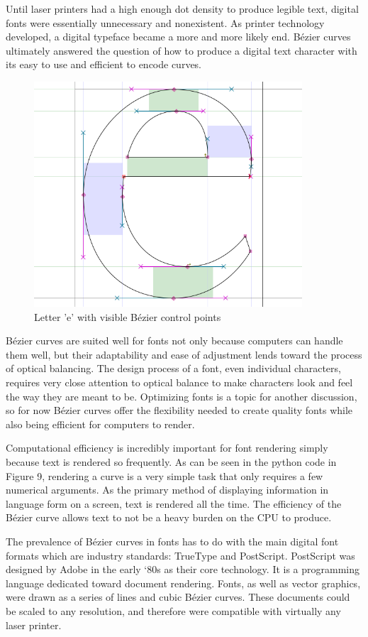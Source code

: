 \documentclass[12pt,letterpaper]{article}
\begin{document}
Until laser printers had a high enough dot density to produce legible text, digital fonts were essentially unnecessary and nonexistent. As printer technology developed, a digital typeface became a more and more likely end. B\'ezier curves ultimately answered the question of how to produce a digital text character with its easy to use and efficient to encode curves.

\begin{figure}[H]
\centering
\includegraphics[width=10cm]{char}
\caption{Letter 'e' with visible B\'ezier control points}
\end{figure}

B\'ezier curves are suited well for fonts not only because computers can handle them well, but their adaptability and ease of adjustment lends toward the process of optical balancing. The design process of a font, even individual characters, requires very close attention to optical balance to make characters look and feel the way they are meant to be. Optimizing fonts is a topic for another discussion, so for now B\'ezier curves offer the flexibility needed to create quality fonts while also being efficient for computers to render. 

Computational efficiency is incredibly important for font rendering simply because text is rendered so frequently. As can be seen in the python code in Figure 9, rendering a curve is a very simple task that only requires a few numerical arguments. As the primary method of displaying information in language form on a screen, text is rendered all the time. The efficiency of the B\'ezier curve allows text to not be a heavy burden on the CPU to produce. 

The prevalence of B\'ezier curves in fonts has to do with the main digital font formats which are industry standards: TrueType and PostScript. PostScript was designed by Adobe in the early ‘80s as their core technology. It is a programming language dedicated toward document rendering. Fonts, as well as vector graphics, were drawn as a series of lines and cubic B\'ezier curves. These documents could be scaled to any resolution, and therefore were compatible with virtually any laser printer. 
\end{document}
